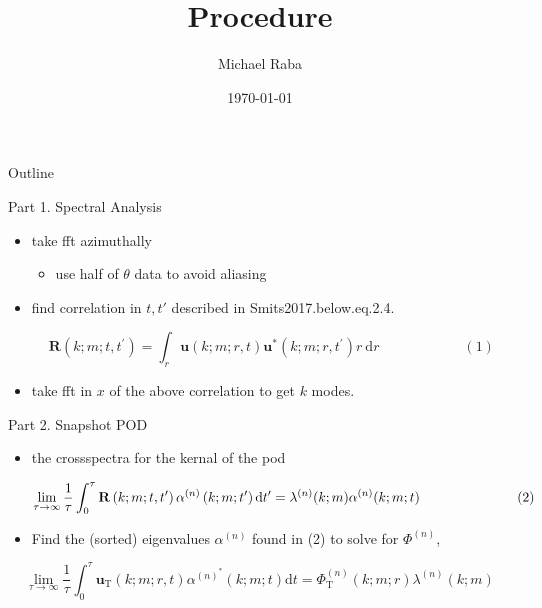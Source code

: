 \documentclass[presentation]{beamer}
\author{Michael Raba}
\date{\today}
\title{Procedure}
\begin{document}
\maketitle
\begin{frame}{Outline}
\tableofcontents
\end{frame}


\begin{frame}[label={sec:orga514ba0}]{Part 1. Spectral Analysis}
\begin{itemize}
\item take fft azimuthally
\begin{itemize}
\item use half of \(\theta\) data to avoid aliasing
\end{itemize}
\item find correlation in \(t,t'\) described in Smits2017.below.eq.2.4.

$$\mathbf{R}\left(k ; m ; t, t^{\prime}\right)=\int_{r} \mathbf{u}(k ; m ; r, t) \mathbf{u}^{*}\left(k ; m ; r, t^{\prime}\right) r \mathrm{~d} r \hspace{1in} (1)$$
\item take fft in \(x\) of the above correlation to get \(k\) modes.
\end{itemize}
\end{frame}

\begin{frame}[label={sec:org23db9d0}]{Part 2. Snapshot POD}
\begin{itemize}
\item the crossspectra for the kernal of the pod

$$\lim_{\tau \rightarrow \infty} \frac{1}{\tau} \int_{0}^{\tau} \mathbf{R}\left(k ; m ; t, t^{\prime}\right) \alpha^{(n)}\left(k ; m ; t^{\prime}\right) \mathrm{d} t^{\prime}=\lambda^{(n)}(k ; m) \alpha^{(n)}(k ; m ; t)\hspace{1 in} (2)$$

\item Find the (sorted) eigenvalues \(\alpha^{(n)}\) found in (2) to solve for \(\Phi^{(n)}\),
\end{itemize}

$$\lim_{\tau \rightarrow \infty} \frac{1}{\tau} \int_{0}^{\tau}\mathbf{u}_{\mathrm{T}}(k ; m ; r, t)\alpha^{(n)^{*}}(k ; m ; t)\mathrm{d} t=\Phi_{\mathrm{T}}^{(n)}(k ; m ; r) \lambda^{(n)}(k ; m)$$
\end{frame}
\end{document}
